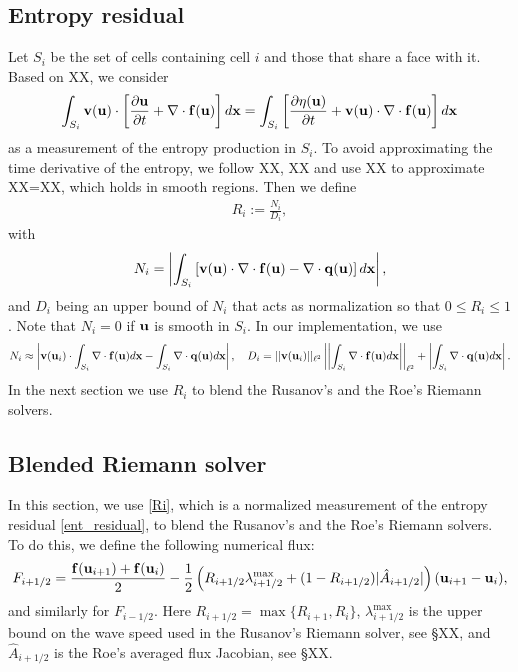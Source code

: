 \documentclass[preprint, 11pt]{article}
\newcommand{\bff}{{\bf f}}
\newcommand{\bfu}{{\bf u}}
\newcommand{\bfv}{{\bf v}}
\newcommand{\bfq}{{\bf q}}
\newcommand{\bfx}{{\bf x}}
\begin{document}
\subsection{Entropy residual}

Let $S_i$ be the set of cells containing cell $i$ and those that share a face with it. 
Based on XX, we consider 
\begin{align}\label{ent_residual}
  \int_{S_i} \bfv(\bfu) \cdot \left[ \frac{\partial \bfu}{\partial t} + \nabla\cdot \bff(\bfu)\right]d\bfx
  =\int_{S_i} \left[\frac{\partial \eta(\bfu)}{\partial t} + \bfv(\bfu) \cdot \nabla\cdot \bff(\bfu)\right] d\bfx
\end{align}
as a measurement of the entropy production in $S_i$. To avoid approximating the time derivative of the entropy, 
we follow XX, XX and use XX to approximate XX=XX, which holds in smooth regions. Then we define 
\begin{align}\label{Ri}
  R_i := \frac{N_i}{D_i}, 
\end{align}
with
\begin{align*}
  N_i=
  \left|\int_{S_i} \left[\bfv(\bfu) \cdot \nabla\cdot \bff(\bfu) - \nabla\cdot\bfq(\bfu) \right] d\bfx\right|,
\end{align*}
and $D_i$ being an upper bound of $N_i$ that acts as normalization so that $0\leq R_i\leq 1$.
Note that $N_i=0$ if $\bfu$ is smooth in $S_i$. 
In our implementation, we use
\begin{align*}
  N_i\approx \left|\bfv(\bfu_i)\cdot \int_{S_i}\nabla\cdot \bff(\bfu)d\bfx 
  -\int_{S_i}\nabla\cdot\bfq(\bfu) d\bfx\right|,
  \quad 
  D_i = ||\bfv(\bfu_i)||_{\ell^2}\left|\left|\int_{S_i}\nabla\cdot\bff(\bfu)d\bfx\right|\right|_{\ell^2}
  +\left|\int_{S_i}\nabla\cdot\bfq(\bfu)d\bfx\right|.
\end{align*}
In the next section we use $R_i$ to blend the Rusanov's and the Roe's Riemann solvers. 

\subsection{Blended Riemann solver}
In this section, we use \eqref{Ri}, which is a normalized measurement of the entropy residual \eqref{ent_residual}, 
to blend the Rusanov's and the Roe's Riemann solvers. To do this, we define the following numerical flux:
\begin{align}\label{num_flux_ev}
  F_{i+1/2} = \frac{\bff(\bfu_{i+1})+\bff(\bfu_i)}{2} 
  - \frac{1}{2} \left( R_{i+1/2}\lambda_{i+1/2}^{\max} + (1-R_{i+1/2})|\hat A_{i+1/2}| \right)(\bfu_{i+1}-\bfu_{i}),
\end{align}
and similarly for $F_{i-1/2}$. Here $R_{i+1/2}=\max\{R_{i+1},R_i\}$, $\lambda_{i+1/2}^{\max}$ is the 
upper bound on the wave speed used in the Rusanov's Riemann solver, see \S XX, and $\hat A_{i+1/2}$
is the Roe's averaged flux Jacobian, see \S XX. 
\end{document}
